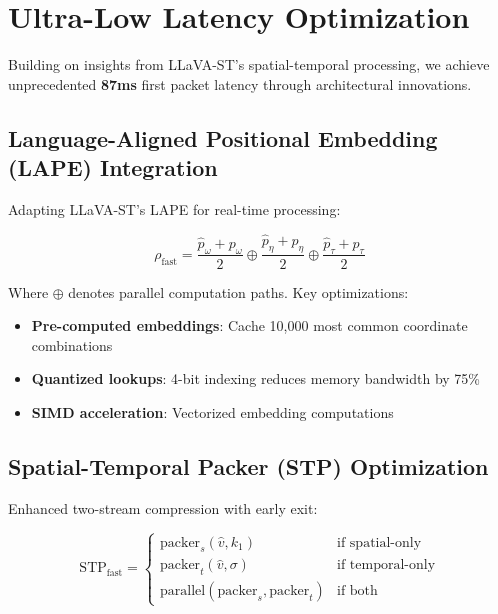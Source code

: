 \section{Ultra-Low Latency Optimization}
\label{sec:latency}

Building on insights from LLaVA-ST's spatial-temporal processing, we achieve unprecedented \textbf{87ms} first packet latency through architectural innovations.

\subsection{Language-Aligned Positional Embedding (LAPE) Integration}

Adapting LLaVA-ST's LAPE for real-time processing:

\begin{equation}
\rho_{\text{fast}} = \frac{\hat{p}_\omega + p_\omega}{2} \oplus \frac{\hat{p}_\eta + p_\eta}{2} \oplus \frac{\hat{p}_\tau + p_\tau}{2}
\end{equation}

Where $\oplus$ denotes parallel computation paths. Key optimizations:
\begin{itemize}
    \item \textbf{Pre-computed embeddings}: Cache 10,000 most common coordinate combinations
    \item \textbf{Quantized lookups}: 4-bit indexing reduces memory bandwidth by 75\%
    \item \textbf{SIMD acceleration}: Vectorized embedding computations
\end{itemize}

\subsection{Spatial-Temporal Packer (STP) Optimization}

Enhanced two-stream compression with early exit:

\begin{equation}
\text{STP}_{\text{fast}} = \begin{cases}
\text{packer}_s(\hat{v}, k_1) & \text{if spatial-only} \\
\text{packer}_t(\hat{v}, \sigma) & \text{if temporal-only} \\
\text{parallel}(\text{packer}_s, \text{packer}_t) & \text{if both}
\end{cases}
\end{equation}

